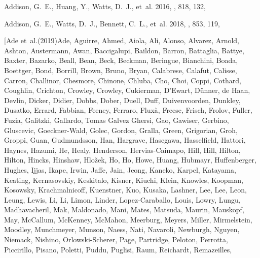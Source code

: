 \documentclass[twocolumn]{aastex63}
\begin{document}
\begin{thebibliography}{}
{Addison}, G.~E., {Huang}, Y., {Watts}, D.~J., {et~al.} 2016, \apj, 818, 132,

{Addison}, G.~E., {Watts}, D.~J., {Bennett}, C.~L., {et~al.} 2018, \apj, 853,
  119, 

\bibitem[{{Ade} {et~al.}(2019){Ade}, {Aguirre}, {Ahmed}, {Aiola}, {Ali},
  {Alonso}, {Alvarez}, {Arnold}, {Ashton}, {Austermann}, {Awan}, {Baccigalupi},
  {Baildon}, {Barron}, {Battaglia}, {Battye}, {Baxter}, {Bazarko}, {Beall},
  {Bean}, {Beck}, {Beckman}, {Beringue}, {Bianchini}, {Boada}, {Boettger},
  {Bond}, {Borrill}, {Brown}, {Bruno}, {Bryan}, {Calabrese}, {Calafut},
  {Calisse}, {Carron}, {Challinor}, {Chesmore}, {Chinone}, {Chluba}, {Cho},
  {Choi}, {Coppi}, {Cothard}, {Coughlin}, {Crichton}, {Crowley}, {Crowley},
  {Cukierman}, {D'Ewart}, {D{\"u}nner}, {de Haan}, {Devlin}, {Dicker},
  {Didier}, {Dobbs}, {Dober}, {Duell}, {Duff}, {Duivenvoorden}, {Dunkley},
  {Dusatko}, {Errard}, {Fabbian}, {Feeney}, {Ferraro}, {Flux{\`a}}, {Freese},
  {Frisch}, {Frolov}, {Fuller}, {Fuzia}, {Galitzki}, {Gallardo}, {Tomas Galvez
  Ghersi}, {Gao}, {Gawiser}, {Gerbino}, {Gluscevic}, {Goeckner-Wald}, {Golec},
  {Gordon}, {Gralla}, {Green}, {Grigorian}, {Groh}, {Groppi}, {Guan},
  {Gudmundsson}, {Han}, {Hargrave}, {Hasegawa}, {Hasselfield}, {Hattori},
  {Haynes}, {Hazumi}, {He}, {Healy}, {Henderson}, {Hervias-Caimapo}, {Hill},
  {Hill}, {Hilton}, {Hilton}, {Hincks}, {Hinshaw}, {Hlo{\v{z}}ek}, {Ho}, {Ho},
  {Howe}, {Huang}, {Hubmayr}, {Huffenberger}, {Hughes}, {Ijjas}, {Ikape},
  {Irwin}, {Jaffe}, {Jain}, {Jeong}, {Kaneko}, {Karpel}, {Katayama}, {Keating},
  {Kernasovskiy}, {Keskitalo}, {Kisner}, {Kiuchi}, {Klein}, {Knowles},
  {Koopman}, {Kosowsky}, {Krachmalnicoff}, {Kuenstner}, {Kuo}, {Kusaka},
  {Lashner}, {Lee}, {Lee}, {Leon}, {Leung}, {Lewis}, {Li}, {Li}, {Limon},
  {Linder}, {Lopez-Caraballo}, {Louis}, {Lowry}, {Lungu}, {Madhavacheril},
  {Mak}, {Maldonado}, {Mani}, {Mates}, {Matsuda}, {Maurin}, {Mauskopf}, {May},
  {McCallum}, {McKenney}, {McMahon}, {Meerburg}, {Meyers}, {Miller},
  {Mirmelstein}, {Moodley}, {Munchmeyer}, {Munson}, {Naess}, {Nati},
  {Navaroli}, {Newburgh}, {Nguyen}, {Niemack}, {Nishino}, {Orlowski-Scherer},
  {Page}, {Partridge}, {Peloton}, {Perrotta}, {Piccirillo}, {Pisano},
  {Poletti}, {Puddu}, {Puglisi}, {Raum}, {Reichardt}, {Remazeilles},
}
\end{thebibliography}
\end{document}
